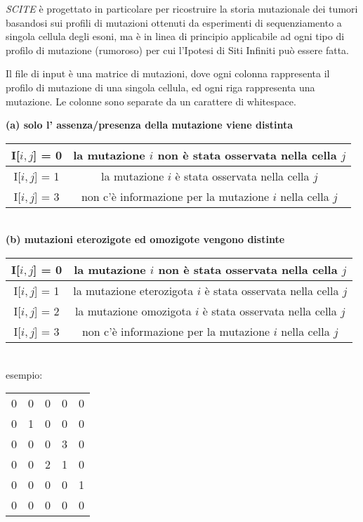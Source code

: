 \textit{SCITE} è progettato in particolare per ricostruire la storia mutazionale dei tumori basandosi sui profili di mutazioni ottenuti da esperimenti di sequenziamento a singola cellula degli esoni, ma è in linea di principio applicabile ad ogni tipo di profilo di mutazione (rumoroso) per cui l'Ipotesi di Siti Infiniti può essere fatta.

Il file di input è una matrice di mutazioni, dove ogni colonna rappresenta il profilo di mutazione di una singola cellula, ed ogni riga rappresenta una mutazione. Le colonne sono separate da un carattere di whitespace.

\begin{center}
\textbf{(a) solo l' assenza/presenza della mutazione viene distinta}
\smallskip

\begin{tabular}{ | c | c | }
	\hline
	I[$i,j$] = 0 & la mutazione $i$ non è stata osservata nella cella $j$ \\
	\hline
	I[$i,j$] = 1 & la mutazione $i$ è stata osservata nella cella $j$ \\
	\hline
	I[$i,j$] = 3 & non c'è informazione per la mutazione $i$ nella cella $j$ \\
	\hline
\end{tabular}\\
\smallskip
\textbf{(b) mutazioni eterozigote ed omozigote vengono distinte}\\
\smallskip
\begin{tabular}{ | c | c | }
	\hline
	I[$i,j$] = 0 & la mutazione $i$ non è stata osservata nella cella $j$ \\
	\hline
	I[$i,j$] = 1 & la mutazione eterozigota $i$ è stata osservata nella cella $j$ \\
	\hline
	I[$i,j$] = 2 & la mutazione omozigota $i$ è stata osservata nella cella $j$ \\
	\hline
	I[$i,j$] = 3 & non c'è informazione per la mutazione $i$ nella cella $j$ \\
	\hline
\end{tabular}\\
\smallskip
esempio:\\
\smallskip
\begin{tabular}{  c c c c c }
	0 & 0 & 0 & 0 & 0 \\
	0 & 1 & 0 & 0 & 0 \\
	0 & 0 & 0 & 3 & 0 \\
	0 & 0 & 2 & 1 & 0 \\
	0 & 0 & 0 & 0 & 1 \\
	0 & 0 & 0 & 0 & 0 \\

\end{tabular}
\end{center}
